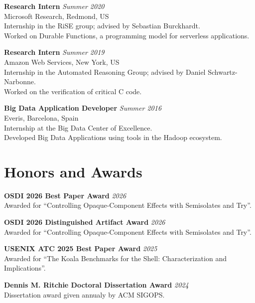 \documentclass[margin]{res}
\begin{document}
\begin{resume}
\textbf{Research Intern} \hfill {\em Summer 2020} \\
Microsoft Research, Redmond, US \\
Internship in the RiSE group; advised by Sebastian Burckhardt. \\
Worked on Durable Functions, a programming model for serverless applications.

\textbf{Research Intern}  \hfill {\em Summer 2019} \\
Amazon Web Services, New York, US \\
Internship in the Automated Reasoning Group; advised by Daniel Schwartz-Narbonne. \\
Worked on the verification of critical C code.


\textbf{Big Data Application Developer}  \hfill {\em Summer 2016} \\
Everis, Barcelona, Spain \\
Internship at the Big Data Center of Excellence. \\
Developed Big Data Applications using tools in the Hadoop ecosystem.

\section{Honors and Awards}
\hypertarget{sec:honors}{}

\textbf{OSDI 2026 Best Paper Award} \hfill {\em 2026} \\
Awarded for ``Controlling Opaque-Component Effects with Semisolates and Try''.

\textbf{OSDI 2026 Distinguished Artifact Award} \hfill {\em 2026} \\
Awarded for ``Controlling Opaque-Component Effects with Semisolates and Try''.

\textbf{USENIX ATC 2025 Best Paper Award} \hfill {\em 2025} \\
Awarded for ``The Koala Benchmarks for the Shell: Characterization and Implications''.

\textbf{Dennis M. Ritchie Doctoral Dissertation Award} \hfill {\em 2024} \\
Dissertation award given annualy by ACM SIGOPS.


\end{resume}
\end{document}
